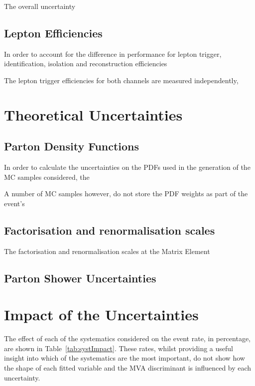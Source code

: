 The overall uncertainty \cite{CMS:2017_lumi} %
\subsection{Lepton Efficiencies}
In order to account for the difference in performance for lepton trigger, identification, isolation and reconstruction efficiencies 

The lepton trigger efficiencies for both channels are measured independently, 

\section{Theoretical Uncertainties}

\subsection{Parton Density Functions}
In order to calculate the uncertainties on the PDFs used in the generation of the MC samples considered, the 

A number of MC samples however, do not store the PDF weights as part of the event's 
\subsection{Factorisation and renormalisation scales}
The factorisation and renormalisation scales at the Matrix Element 
\subsection{Parton Shower Uncertainties}
\section{Impact of the Uncertainties}
The effect of each of the systematics considered on the event rate, in percentage, are shown in Table~\ref{tab:systImpact}.
These rates, whilst providing a useful insight into which of the systematics are the most important, do not show how the shape of each fitted variable and the MVA discriminant is influenced by each uncertainty.

